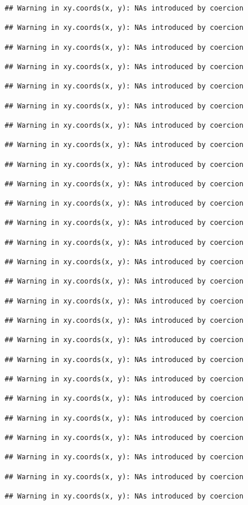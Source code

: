 \documentclass[]{article}
\begin{document}
\begin{verbatim}
## Warning in xy.coords(x, y): NAs introduced by coercion

## Warning in xy.coords(x, y): NAs introduced by coercion

## Warning in xy.coords(x, y): NAs introduced by coercion

## Warning in xy.coords(x, y): NAs introduced by coercion

## Warning in xy.coords(x, y): NAs introduced by coercion

## Warning in xy.coords(x, y): NAs introduced by coercion

## Warning in xy.coords(x, y): NAs introduced by coercion

## Warning in xy.coords(x, y): NAs introduced by coercion

## Warning in xy.coords(x, y): NAs introduced by coercion

## Warning in xy.coords(x, y): NAs introduced by coercion

## Warning in xy.coords(x, y): NAs introduced by coercion

## Warning in xy.coords(x, y): NAs introduced by coercion

## Warning in xy.coords(x, y): NAs introduced by coercion

## Warning in xy.coords(x, y): NAs introduced by coercion

## Warning in xy.coords(x, y): NAs introduced by coercion

## Warning in xy.coords(x, y): NAs introduced by coercion

## Warning in xy.coords(x, y): NAs introduced by coercion

## Warning in xy.coords(x, y): NAs introduced by coercion

## Warning in xy.coords(x, y): NAs introduced by coercion

## Warning in xy.coords(x, y): NAs introduced by coercion

## Warning in xy.coords(x, y): NAs introduced by coercion

## Warning in xy.coords(x, y): NAs introduced by coercion

## Warning in xy.coords(x, y): NAs introduced by coercion

## Warning in xy.coords(x, y): NAs introduced by coercion

## Warning in xy.coords(x, y): NAs introduced by coercion

## Warning in xy.coords(x, y): NAs introduced by coercion


\end{verbatim}
\end{document}
